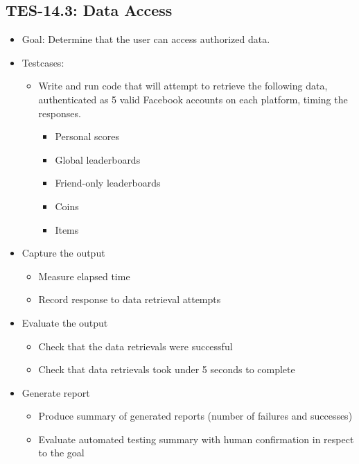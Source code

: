 \subsection{TES-14.3: Data Access}
\label{subsec:accessdata}
\begin{itemize}
\item Goal: Determine that the user can access authorized data.

\item Testcases: 
\begin{itemize}
\item Write and run code that will attempt to retrieve the following data, 
authenticated as 5 valid Facebook accounts on each platform, 
timing the responses.
\begin{itemize}
\item Personal scores
\item Global leaderboards
\item Friend-only leaderboards
\item Coins
\item Items
\end{itemize}
\end{itemize}

\item Capture the output 
\begin{itemize}
\item Measure elapsed time 
\item Record response to data retrieval attempts
\end{itemize}

\item Evaluate the output 
\begin{itemize}
\item Check that the data retrievals were successful
\item Check that data retrievals took under 5 seconds to complete
\end{itemize}

\item Generate report 
\begin{itemize}
\item Produce summary of generated reports (number of failures and successes)
\item Evaluate automated testing summary with human confirmation in respect to the goal
\end{itemize}
\end{itemize}


